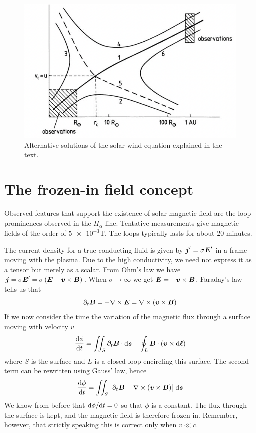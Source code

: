 \begin{figure}[t]
    \centering
    \includegraphics[width=.6\linewidth]{bilder/L9_solution_solar_wind_equation.png}
    \caption{Alternative solutions of the solar wind equation explained in the text.}
    \label{fig:L9_solution_solar_wind_equation}
\end{figure}

\section{The frozen-in field concept}
Observed features that support the existence of solar magnetic field are the loop prominences observed in the \(H_\alpha \) line. Tentative measurements give magnetic fields of the order of \(\num{5e-3}\si{\tesla}\). The loops typically lasts for about 20 minutes.

The current density for a true conducting fluid is given by \(\boldsymbol{j}'=\sigma\boldsymbol{E}'\) in a frame moving with the plasma. Due to the high conductivity, we need not express it as a tensor but merely as a scalar. From Ohm's law we have \(\boldsymbol{j}=\sigma\boldsymbol{E}'=\sigma\left(\boldsymbol{E}+\boldsymbol{v}\times\boldsymbol{B}\right)\). When \(\sigma\rightarrow\infty \) we get \(\boldsymbol{E}=-\boldsymbol{v}\times\boldsymbol{B}\). Faraday's law tells us that
\begin{equation*}
    \partial_{t}\boldsymbol{B}=-\nabla\times\boldsymbol{E}=\nabla\times\left(\boldsymbol{v}\times\boldsymbol{B}\right)
\end{equation*}
If we now consider the time the variation of the magnetic flux through a surface moving with velocity \(v\)
\begin{equation*}
    \frac{\textnormal{d}\phi}{\textnormal{d}t}=\iint_S\partial_{t}\boldsymbol{B}\cdot\textnormal{d}\boldsymbol{s}+\oint_L\boldsymbol{B}\cdot\left(\boldsymbol{v}\times\textnormal{d}\boldsymbol{\ell}\right)
\end{equation*}
where \(S\) is the surface and \(L\) is a closed loop encircling this surface. The second term can be rewritten using Gauss' law, hence
\begin{eqnarray}
    \frac{\textnormal{d}\phi}{\textnormal{d}t}=\iint_S\left[\partial_{t}\boldsymbol{B}-\nabla\times\left(\boldsymbol{v}\times\boldsymbol{B}\right)\right]\textnormal{d}\boldsymbol{s}
\end{eqnarray}
We know from before that \(\textnormal{d}\phi/\textnormal{d}t=0\) so that \(\phi \) is a constant. The flux through the surface is kept, and the magnetic field is therefore frozen-in. Remember, however, that strictly speaking this is correct only when \(v\ll c\).

